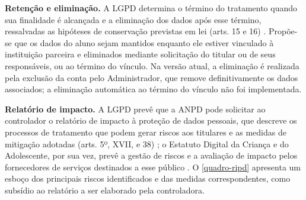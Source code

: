 \textbf{Retenção e eliminação.} A LGPD determina o término do tratamento quando sua finalidade é alcançada e a eliminação dos dados após esse término, ressalvadas as hipóteses de conservação previstas em lei (arts. 15 e 16) \cite{brasil2018lgpd}. Propõe-se que os dados do aluno sejam mantidos enquanto ele estiver vinculado à instituição parceira e eliminados mediante solicitação do titular ou de seus responsáveis, ou ao término do vínculo. Na versão atual, a eliminação é realizada pela exclusão da conta pelo Administrador, que remove definitivamente os dados associados; a eliminação automática ao término do vínculo não foi implementada.

\textbf{Relatório de impacto.} A LGPD prevê que a ANPD pode solicitar ao controlador o relatório de impacto à proteção de dados pessoais, que descreve os processos de tratamento que podem gerar riscos aos titulares e as medidas de mitigação adotadas (arts. 5º, XVII, e 38) \cite{brasil2018lgpd}; o Estatuto Digital da Criança e do Adolescente, por sua vez, prevê a gestão de riscos e a avaliação de impacto pelos fornecedores de serviços destinados a esse público \cite{brasil2025lei15211}. O \autoref{quadro-ripd} apresenta um esboço dos principais riscos identificados e das medidas correspondentes, como subsídio ao relatório a ser elaborado pela controladora.

